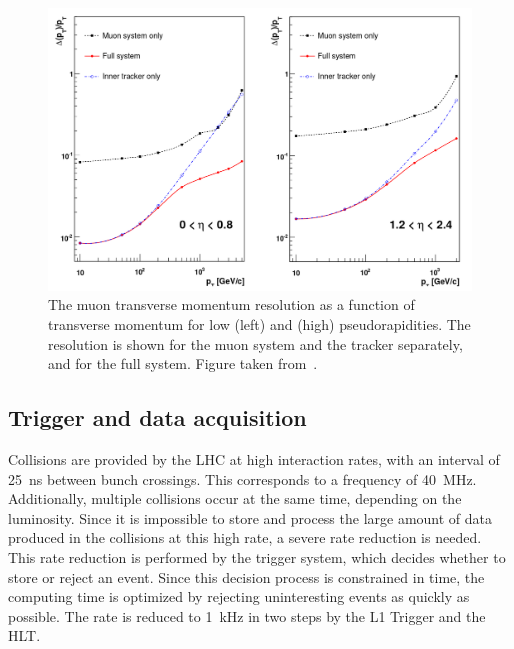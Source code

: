 \begin{figure}[ht]
  \centering
 \includegraphics[width=.9\textwidth]{muon_res}
 \caption{The muon transverse momentum resolution as a function of transverse momentum for low (left) and (high) pseudorapidities. The resolution is shown for the muon system and the tracker separately, and for the full system. Figure taken from~\cite{Chatrchyan:2008aa}.}
 \label{fig:muon_res}
\end{figure}

\subsection{Trigger and data acquisition}

Collisions are provided by the \ac{LHC} at high interaction rates, with an interval of \SI{25}{ns} between bunch crossings. This corresponds to a frequency of \SI{40}{MHz}. Additionally, multiple collisions occur at the same time, depending on the luminosity. Since it is impossible to store and process the large amount of data produced in the collisions at this high rate, a severe rate reduction is needed. This rate reduction is performed by the trigger system, which decides whether to store or reject an event. Since this decision process is constrained in time, the computing time is optimized by rejecting uninteresting events as quickly as possible. The rate is reduced to \SI{1}{kHz} in two steps by the \ac{L1} Trigger and the \ac{HLT}.

